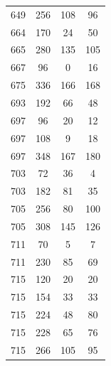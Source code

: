 \documentclass[12pt]{amsproc} %
\theoremstyle{definition}\newtheorem{defn}[thm]{Definition}
\theoremstyle{definition}\newtheorem{rem}[thm]{Remark}
\theoremstyle{definition}\newtheorem{ex}[thm]{Example}
\begin{document}
\begin{table}[ht!]
\begin{minipage}{0.25\textwidth}
\begin{tabular}{c|c|c|c}
      649&256&108&96\\ 
      664&170&24&50\\ 
      665&280&135&105\\ 
      667&96&0&16\\ 
      675&336&166&168\\ 
      693&192&66&48\\ 
      697&96&20&12\\ 
      697&108&9&18\\ 
      697&348&167&180\\
      703&72&36&4\\ 
      703&182&81&35\\ 
      705&256&80&100\\ 
      705&308&145&126\\ 
      711&70&5&7\\ 
      711&230&85&69\\ 
      715&120&20&20\\ 
      715&154&33&33\\ 
      715&224&48&80\\ 
      715&228&65&76\\ 
      715&266&105&95\\ 
        \end{tabular}
    \end{minipage}
\end{table}
\end{document}
